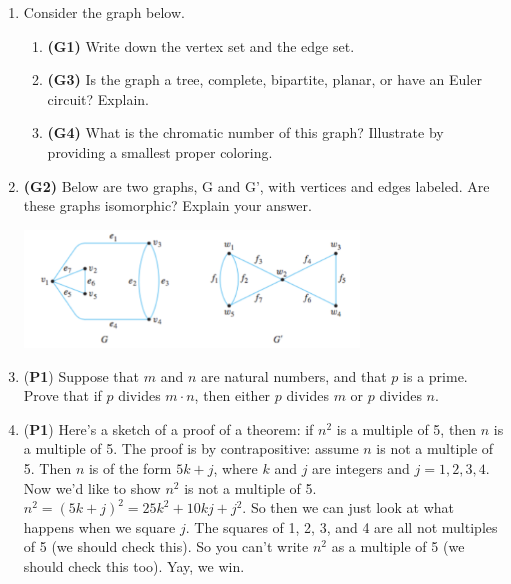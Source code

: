 \documentclass[12pt]{article}
\begin{document}
\begin{enumerate}
\item Consider the graph below.


\begin{enumerate}
    \item \textbf{(G1)} Write down the vertex set and the edge set.
    \item \textbf{(G3)} Is the graph a tree, complete, bipartite, planar, or have an Euler circuit? Explain. 
    \item \textbf{(G4)} What is the chromatic number of this graph? Illustrate by providing a smallest proper coloring.
\end{enumerate}

\item \textbf{(G2)} Below are two graphs, G and G', with vertices and edges labeled. Are these graphs isomorphic? Explain your answer.

\begin{center}
\includegraphics[width=0.7\textwidth]{graphs_picture.png}
\end{center}

\hrulefill %

\item (\textbf{P1}) 
Suppose that $m$ and $n$ are natural numbers, and that $p$ is a prime. Prove that if $p$ divides $m\cdot n$, then either $p$ divides $m$ or $p$ divides $n$.

\item (\textbf{P1}) Here's a sketch of a proof of a theorem: if $n^2$ is a multiple of 5, then $n$ is a multiple of 5. The proof is by contrapositive: assume $n$ is not a multiple of 5. Then $n$ is of the form $5k + j$, where $k$ and $j$ are integers and $j = 1, 2, 3, 4$. Now we'd like to show $n^2$ is not a multiple of 5. $n^2 = (5k+j)^2 = 25k^2 + 10kj + j^2$. So then we can just look at what happens when we square $j$. The squares of 1, 2, 3, and 4 are all not multiples of 5 (we should check this). So you can't write $n^2$ as a multiple of 5 (we should check this too). Yay, we win.


\end{enumerate}
\end{document}
